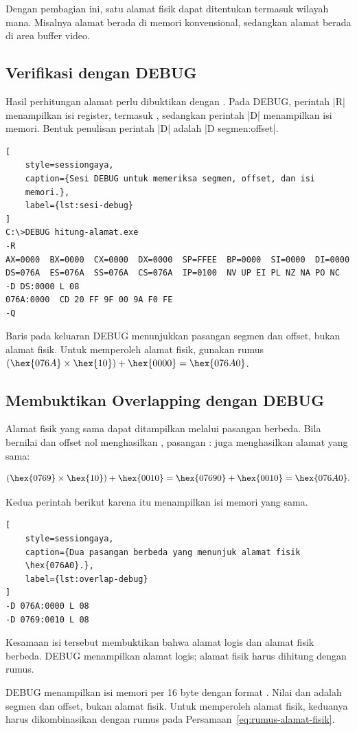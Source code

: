 Dengan pembagian ini, satu alamat fisik dapat ditentukan termasuk
wilayah mana. Misalnya alamat  berada di memori
konvensional, sedangkan alamat  berada di area buffer
video.

\subsection{Verifikasi dengan DEBUG}

Hasil perhitungan alamat perlu dibuktikan dengan .
Pada DEBUG, perintah \lstasm|R| menampilkan isi register, termasuk
, sedangkan perintah \lstasm|D| menampilkan isi memori.
Bentuk penulisan perintah \lstasm|D| adalah
\lstasm|D segmen:offset|.

\begin{lstlisting}[
    style=sessiongaya,
    caption={Sesi DEBUG untuk memeriksa segmen, offset, dan isi
    memori.},
    label={lst:sesi-debug}
]
C:\>DEBUG hitung-alamat.exe
-R
AX=0000  BX=0000  CX=0000  DX=0000  SP=FFEE  BP=0000  SI=0000  DI=0000
DS=076A  ES=076A  SS=076A  CS=076A  IP=0100  NV UP EI PL NZ NA PO NC
-D DS:0000 L 08
076A:0000  CD 20 FF 9F 00 9A F0 FE
-Q
\end{lstlisting}

Baris  pada keluaran DEBUG menunjukkan pasangan
segmen dan offset, bukan alamat fisik. Untuk memperoleh alamat
fisik, gunakan rumus
$(\hex{076A} \times \hex{10}) + \hex{0000} = \hex{076A0}$.

\subsection{Membuktikan Overlapping dengan DEBUG}

Alamat fisik yang sama dapat ditampilkan melalui pasangan berbeda.
Bila  bernilai  dan offset nol menghasilkan
, pasangan : juga menghasilkan alamat
yang sama:

\[
    (\hex{0769} \times \hex{10}) + \hex{0010}
    = \hex{07690} + \hex{0010} = \hex{076A0}.
\]

Kedua perintah berikut karena itu menampilkan isi memori yang sama.

\begin{lstlisting}[
    style=sessiongaya,
    caption={Dua pasangan berbeda yang menunjuk alamat fisik
    \hex{076A0}.},
    label={lst:overlap-debug}
]
-D 076A:0000 L 08
-D 0769:0010 L 08
\end{lstlisting}

Kesamaan isi tersebut membuktikan bahwa alamat logis dan alamat
fisik berbeda. DEBUG menampilkan alamat logis; alamat fisik harus
dihitung dengan rumus.

\begin{infobox}
\vspace{1.1em}
DEBUG menampilkan isi memori per 16 byte dengan format
. Nilai  dan 
adalah segmen dan offset, bukan alamat fisik. Untuk memperoleh
alamat fisik, keduanya harus dikombinasikan dengan rumus pada
Persamaan~\ref{eq:rumus-alamat-fisik}.
\end{infobox}
